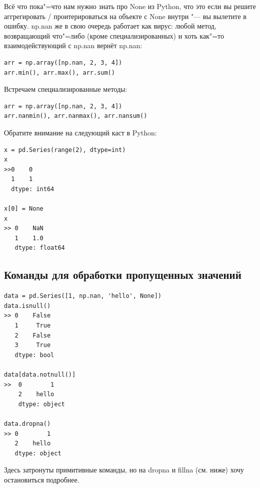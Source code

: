 \documentclass{article}
\begin{document}
Всё что пока"=что нам нужно знать про None из Python, что это если вы решите аггрегировать / проитерироваться на объекте с None внутри "--- вы вылетите в ошибку. np.nan же в свою очередь работает как вирус: любой метод, возвращающий что"=либо (кроме специализированных) и хоть как"=то взаимодействующий с np.nan вернёт np.nan:
\begin{verbatim}
arr = np.array([np.nan, 2, 3, 4])
arr.min(), arr.max(), arr.sum()
\end{verbatim}
Встречаем специализированные методы:
\begin{verbatim}
arr = np.array([np.nan, 2, 3, 4])
arr.nanmin(), arr.nanmax(), arr.nansum()
\end{verbatim}
Обратите внимание на следующий каст в Python:
\begin{verbatim}
x = pd.Series(range(2), dtype=int)
x
>>0    0
  1    1
  dtype: int64

x[0] = None
x
>> 0    NaN
   1    1.0
   dtype: float64
\end{verbatim}

\subsection*{Команды для обработки пропущенных значений }
\begin{verbatim}
data = pd.Series([1, np.nan, 'hello', None])
data.isnull()
>> 0    False
   1     True
   2    False
   3     True
   dtype: bool

data[data.notnull()]
>>  0        1
    2    hello
    dtype: object
    
data.dropna()
>> 0        1
   2    hello
   dtype: object
\end{verbatim}
Здесь затронуты примитивные команды, но на dropna и fillna (см. ниже) хочу остановиться подробнее.
\end{document}
